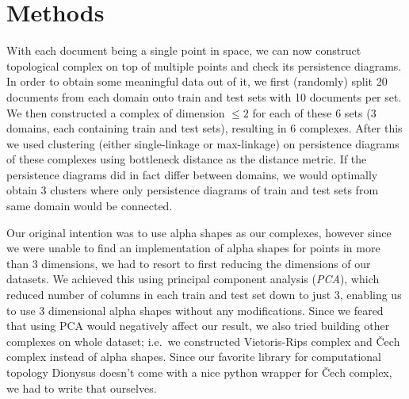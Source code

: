 \section{Methods} 
\label{sec:methods}

With each document being a single point in space, we can now construct
topological complex on top of multiple points and check its persistence
diagrams. In order to obtain some meaningful data out of it, we first
(randomly) split 20 documents from each domain onto train and test sets with 10
documents per set. We then constructed a complex of dimension $\le 2$ for each
of these 6 sets (3 domains, each containing train and test sets), resulting in
6 complexes. After this we used clustering (either single-linkage or
max-linkage) on persistence diagrams of these complexes using bottleneck
distance as the distance metric. If the persistence diagrams did in fact differ
between domains, we would optimally obtain 3 clusters where only persistence
diagrams of train and test sets from same domain would be connected.

Our original intention was to use alpha shapes as our complexes, however since
we were unable to find an implementation of alpha shapes for points in more
than $3$ dimensions, we had to resort to first reducing the dimensions of our
datasets. We achieved this using principal component analysis (\textit{PCA}),
which reduced number of columns in each train and test set down to just 3,
enabling us to use 3 dimensional alpha shapes without any modifications. Since
we feared that using PCA would negatively affect our result, we also tried
building other complexes on whole dataset; i.e.\ we constructed Vietoris-Rips
complex and Čech complex instead of alpha shapes. Since our favorite library
for computational topology Dionysus doesn't come with a nice python wrapper for
Čech complex, we had to write that ourselves.

